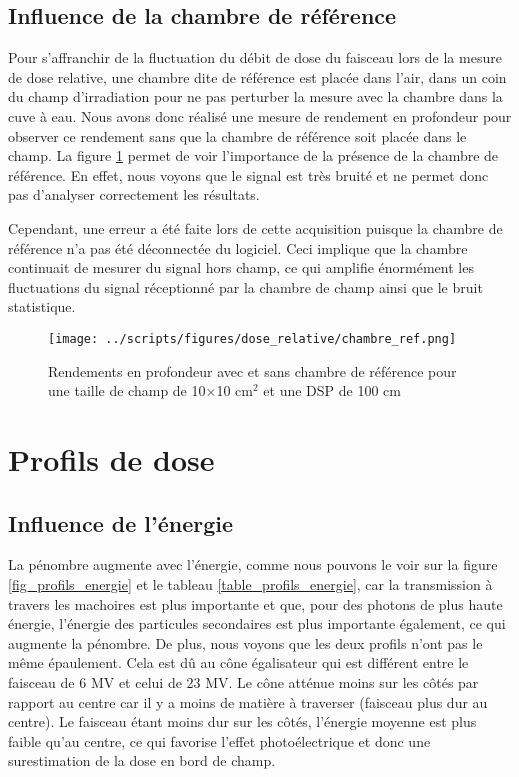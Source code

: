 \documentclass{book}
\begin{document}
\newpage
\subsection{Influence de la chambre de référence}

Pour s'affranchir de la fluctuation du débit de dose du faisceau lors de la mesure de dose relative, une chambre dite de référence est placée dans l'air, dans un coin du champ d'irradiation pour ne pas perturber la mesure avec la chambre dans la cuve à eau. Nous avons donc réalisé une mesure de rendement en profondeur pour observer ce rendement sans que la chambre de référence soit placée dans le champ. La figure \ref*{fig_sanss_chambre_ref} permet de voir l'importance de la présence de la chambre de référence. En effet, nous voyons que le signal est très bruité et ne permet donc pas d'analyser correctement les résultats.

Cependant, une erreur a été faite lors de cette acquisition puisque la chambre de référence n'a pas été déconnectée du logiciel. Ceci implique que la chambre continuait de mesurer du signal hors champ, ce qui amplifie énormément les fluctuations du signal réceptionné par la chambre de champ ainsi que le bruit statistique.

\begin{figure}[h!]
  \centering
  \texttt{[image: ../scripts/figures/dose\_relative/chambre\_ref.png]}
  \caption{Rendements en profondeur avec et sans chambre de référence pour une taille de champ de 10$\times$10 cm$^2$ et une DSP de 100 cm}
  \label{fig_sanss_chambre_ref}
\end{figure}

\section{Profils de dose}
\subsection{Influence de l'énergie}

La pénombre augmente avec l'énergie, comme nous pouvons le voir sur la figure \ref*{fig_profils_energie} et le tableau \ref*{table_profils_energie}, car la transmission à travers les machoires est plus importante et que, pour des photons de plus haute énergie, l'énergie des particules secondaires est plus importante également, ce qui augmente la pénombre. De plus, nous voyons que les deux profils n'ont pas le même épaulement. Cela est dû au cône égalisateur qui est différent entre le faisceau de 6 MV et celui de 23 MV. Le cône atténue moins sur les côtés par rapport au centre car il y a moins de matière à traverser (faisceau plus dur au centre). Le faisceau étant moins dur sur les côtés, l'énergie moyenne est plus faible qu'au centre, ce qui favorise l'effet photoélectrique et donc une surestimation de la dose en bord de champ.
\end{document}
